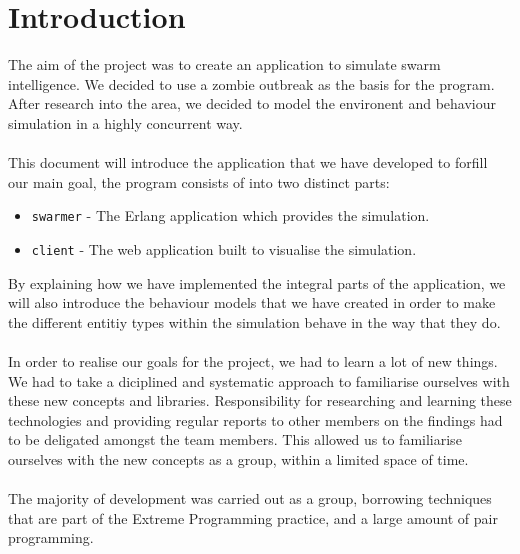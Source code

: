 \documentclass[10pt, a4paper, conference, compsocconf]{IEEEtran}
\begin{document}
\section{Introduction \label{intro}}
The aim of the project was to create an application to simulate swarm intelligence. We decided to use a zombie outbreak as the basis for the program. After research into the area, we decided to model the environent and behaviour simulation in a highly concurrent way.\\
\\
This document will introduce the application that we have developed to forfill our main goal, the program consists of into two distinct parts:
\begin{itemize}
    \item \verb+swarmer+ - The Erlang application which provides the simulation.
    \item \verb+client+ - The web application built to visualise the simulation.
\end{itemize}
By explaining how we have implemented the integral parts of the application, we will also introduce the behaviour models that we have created in order to make the different entitiy types within the simulation behave in the way that they do.\\
\\%
In order to realise our goals for the project, we had to learn a lot of new things. We had to take a diciplined and systematic approach to familiarise ourselves with these new concepts and libraries. Responsibility for researching and learning these technologies and providing regular reports to other members on the findings had to be deligated amongst the team members. This allowed us to familiarise ourselves with the new concepts as a group, within a limited space of time.\\
\\%
The majority of development was carried out as a group, borrowing techniques that are part of the Extreme Programming practice, and a large amount of pair programming.\\
\end{document}
